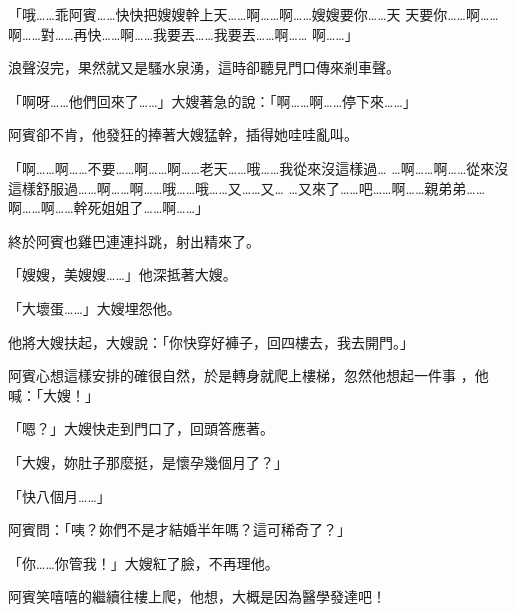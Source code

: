 「哦……乖阿賓……快快把嫂嫂幹上天……啊……啊……嫂嫂要你……天
天要你……啊……啊……對……再快……啊……我要丟……我要丟……啊……
啊……」

浪聲沒完，果然就又是騷水泉湧，這時卻聽見門口傳來剎車聲。

「啊呀……他們回來了……」大嫂著急的說：「啊……啊……停下來……」

阿賓卻不肯，他發狂的捧著大嫂猛幹，插得她哇哇亂叫。

「啊……啊……不要……啊……啊……老天……哦……我從來沒這樣過…
…啊……啊……從來沒這樣舒服過……啊……啊……哦……哦……又……又…
…又來了……吧……啊……親弟弟……啊……啊……幹死姐姐了……啊……」

終於阿賓也雞巴連連抖跳，射出精來了。

「嫂嫂，美嫂嫂……」他深抵著大嫂。

「大壞蛋……」大嫂埋怨他。

他將大嫂扶起，大嫂說：「你快穿好褲子，回四樓去，我去開門。」

阿賓心想這樣安排的確很自然，於是轉身就爬上樓梯，忽然他想起一件事
，他喊：「大嫂！」

「嗯？」大嫂快走到門口了，回頭答應著。

「大嫂，妳肚子那麼挺，是懷孕幾個月了？」

「快八個月……」

阿賓問：「咦？妳們不是才結婚半年嗎？這可稀奇了？」

「你……你管我！」大嫂紅了臉，不再理他。

阿賓笑嘻嘻的繼續往樓上爬，他想，大概是因為醫學發達吧！










